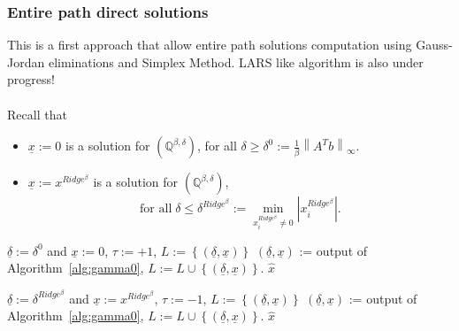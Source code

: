\documentclass[fleqn]{report} %
\newcommand\ddfrac[2]{\frac{\displaystyle #1}{\displaystyle #2}}
\begin{document}
\subsubsection{Entire path direct solutions}
This is a first approach that allow entire path solutions computation using Gauss-Jordan eliminations and Simplex Method. LARS like algorithm is also under progress!\\\\
Recall that 
\begin{itemize}
\item $\underline{x}:=0$ is a solution for  $(\mathbb{Q}^{\beta,\delta})$, 
for all $\delta\geq \delta^0:=\ddfrac{1}{\beta}\left\|A^Tb\right\|_{\infty}$.
\item $\underline{x}:=x^{Ridge^{\beta}}$ is a solution for  $(\mathbb{Q}^{\beta,\delta})$, 
\[\text{for all} \;\delta\leq\delta^{Ridge^{\beta}}:=
\underset{x^{Ridge^{\beta}}_i\neq 0}{\min}\left|x^{Ridge^{\beta}}_i\right|.\]
\end{itemize}
\begin{algorithm}[H]
        \caption{Full path computation $(\mathbb{Q}^{\beta,\delta})$, $\delta\geq 0$}
        \label{alg:full0}
        \begin{algorithmic}[1] %
            \State  $\underline{\delta}:=\delta^0$ and $\underline{x}:=0$, $\tau:=+1$,
          \State $L := \left\{(\underline{\delta}, \underline{x})\right\}$
		\State $(\underline{\delta}, \underline{x})$ := output of Algorithm~\ref{alg:gamma0},
                     \State $L := L\cup\left\{(\underline{\delta}, \underline{x})\right\}$.
	\EndWhile
            \State \Return $\hat{x}$
        \end{algorithmic}
    \end{algorithm}

\begin{algorithm}[H]
        \caption{Full path computation $(\mathbb{Q}^{\beta,\delta})$, $\delta\geq 0$}
        \label{alg:fullRidge}
        \begin{algorithmic}[1] %
            \State  $\underline{\delta}:=\delta^{Ridge^{\beta}}$ and $\underline{x}:=x^{Ridge^{\beta}}$, $\tau:=-1$,
          \State $L := \left\{(\underline{\delta}, \underline{x})\right\}$
		\State $(\underline{\delta}, \underline{x})$ := output of Algorithm~\ref{alg:gamma0},
                     \State $L := L\cup\left\{(\underline{\delta}, \underline{x})\right\}$.
	\EndWhile
            \State \Return $\hat{x}$
        \end{algorithmic}
    \end{algorithm}
\end{document}

